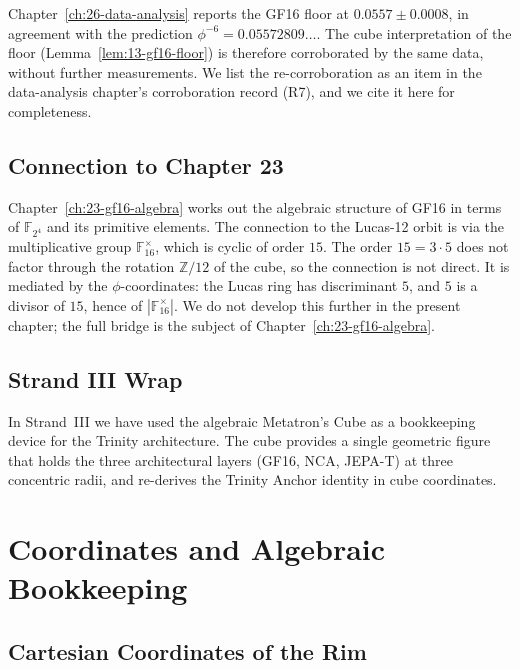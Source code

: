 Chapter~\ref{ch:26-data-analysis} reports the GF16 floor at
$0.0557 \pm 0.0008$, in agreement with the prediction
$\phi^{-6} = 0.05572809\ldots$. The cube interpretation of the
floor (Lemma~\ref{lem:13-gf16-floor}) is therefore corroborated by
the same data, without further measurements. We list the
re-corroboration as an item in the data-analysis chapter's
corroboration record (R7), and we cite it here for completeness.

\subsection{Connection to Chapter 23}
\label{sec:13-conn-23}

Chapter~\ref{ch:23-gf16-algebra} works out the algebraic structure
of GF16 in terms of $\mathbb{F}_{2^{4}}$ and its primitive elements.
The connection to the Lucas-12 orbit is via the multiplicative
group $\mathbb{F}_{16}^{\times}$, which is cyclic of order $15$.
The order $15 = 3 \cdot 5$ does not factor through the rotation
$\mathbb{Z}/12$ of the cube, so the connection is not direct. It
is mediated by the $\phi$-coordinates: the Lucas ring has
discriminant $5$, and $5$ is a divisor of $15$, hence of
$|\mathbb{F}_{16}^{\times}|$. We do not develop this further in the
present chapter; the full bridge is the subject of
Chapter~\ref{ch:23-gf16-algebra}.

\subsection{Strand III Wrap}
\label{sec:13-strand-III-wrap}

In Strand~III we have used the algebraic Metatron's Cube as a
bookkeeping device for the Trinity architecture. The cube provides
a single geometric figure that holds the three architectural layers
(GF16, NCA, JEPA-T) at three concentric radii, and re-derives the
Trinity Anchor identity in cube coordinates.


\section{Coordinates and Algebraic Bookkeeping}
\label{sec:13-coords-bookkeeping}

\subsection{Cartesian Coordinates of the Rim}
\label{sec:13-cartesian-rim}

